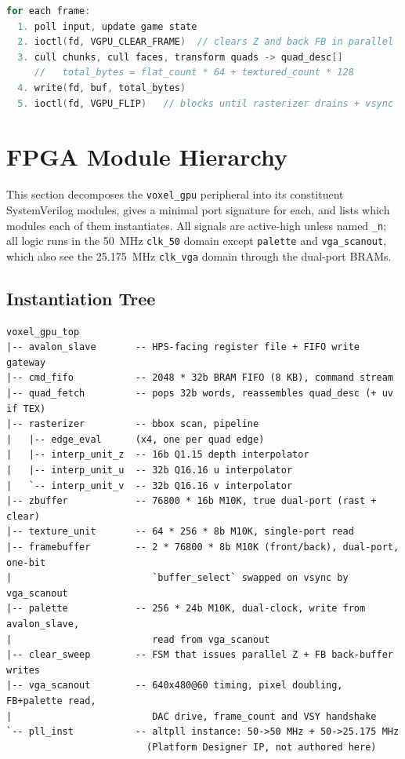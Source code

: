 \documentclass[11pt]{article}
\begin{document}
\begin{lstlisting}[language=C]
for each frame:
  1. poll input, update game state
  2. ioctl(fd, VGPU_CLEAR_FRAME)  // clears Z and back FB in parallel
  3. cull chunks, cull faces, transform quads -> quad_desc[]
     //   total_bytes = flat_count * 64 + textured_count * 128
  4. write(fd, buf, total_bytes)
  5. ioctl(fd, VGPU_FLIP)   // blocks until rasterizer drains + vsync
\end{lstlisting}

\section{FPGA Module Hierarchy}
\label{sec:modules}

This section decomposes the \texttt{voxel\_gpu} peripheral into its constituent SystemVerilog modules, gives a minimal port signature for each, and lists which modules each of them instantiates. All signals are active-high unless named \texttt{\_n}; all logic runs in the 50~MHz \texttt{clk\_50} domain except \texttt{palette} and \texttt{vga\_scanout}, which also see the 25.175~MHz \texttt{clk\_vga} domain through the dual-port BRAMs.

\subsection{Instantiation Tree}

\begin{lstlisting}
voxel_gpu_top
|-- avalon_slave       -- HPS-facing register file + FIFO write gateway
|-- cmd_fifo           -- 2048 * 32b BRAM FIFO (8 KB), command stream
|-- quad_fetch         -- pops 32b words, reassembles quad_desc (+ uv if TEX)
|-- rasterizer         -- bbox scan, pipeline
|   |-- edge_eval      (x4, one per quad edge)
|   |-- interp_unit_z  -- 16b Q1.15 depth interpolator
|   |-- interp_unit_u  -- 32b Q16.16 u interpolator
|   `-- interp_unit_v  -- 32b Q16.16 v interpolator
|-- zbuffer            -- 76800 * 16b M10K, true dual-port (rast + clear)
|-- texture_unit       -- 64 * 256 * 8b M10K, single-port read
|-- framebuffer        -- 2 * 76800 * 8b M10K (front/back), dual-port, one-bit
|                         `buffer_select` swapped on vsync by vga_scanout
|-- palette            -- 256 * 24b M10K, dual-clock, write from avalon_slave,
|                         read from vga_scanout
|-- clear_sweep        -- FSM that issues parallel Z + FB back-buffer writes
|-- vga_scanout        -- 640x480@60 timing, pixel doubling, FB+palette read,
|                         DAC drive, frame_count and VSY handshake
`-- pll_inst           -- altpll instance: 50->50 MHz + 50->25.175 MHz
                         (Platform Designer IP, not authored here)
\end{lstlisting}
\end{document}
